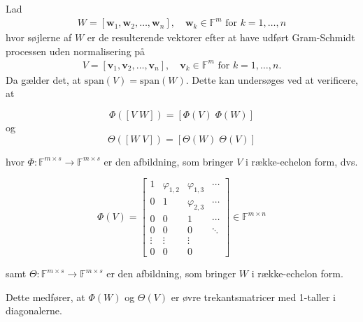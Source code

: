 \vspace{0.5cm}
\begin{theorem}\label{span_theorem}
    Lad 
    \begin{gather*}
        W = [\mathbf{w}_1, \mathbf{w}_2, \ldots, \mathbf{w}_n], \quad \mathbf{w}_k \in \mathbb{F}^m \text{ for } k = 1, \ldots, n
    \end{gather*}
    hvor søjlerne af \( W \) er de resulterende vektorer efter at have udført Gram-Schmidt processen uden normalisering på 
    \begin{gather*}
        V = [\mathbf{v}_1, \mathbf{v}_2, \ldots, \mathbf{v}_n], \quad \mathbf{v}_k \in \mathbb{F}^m \text{ for } k = 1, \ldots, n.
    \end{gather*}
    Da gælder det, at \( \text{span}(V) = \text{span}(W) \). Dette kan undersøges ved at verificere, at
    
    \[ \Phi([V \; W]) = [\Phi(V) \; \Phi(W)] \]
    og 
    \[\Theta([W \; V]) = [\Theta(W) \; \Theta(V)] \]

    hvor \(\Phi : \mathbb{F}^{m \times s} \to \mathbb{F}^{m \times s}\) er den afbildning, som bringer \(V\) i række-echelon form, dvs.
    
    \[
        \Phi(V) = 
        \begin{bmatrix}
            1 & \varphi_{1,2} & \varphi_{1,3} & \cdots \\
            0 & 1 & \varphi_{2,3} & \cdots \\
            0 & 0 & 1 & \cdots \\
            0 & 0 & 0 & \ddots\\
            \vdots & \vdots & \vdots  \\
            0 & 0 & 0 & 
        \end{bmatrix} \in \mathbb{F}^{m \times n}
    \]

    samt \(\Theta : \mathbb{F}^{m \times s} \to \mathbb{F}^{m \times s}\) er den afbildning, som bringer \(W\) i række-echelon form.

    Dette medfører, at \(\Phi(W)\) og \(\Theta(V)\) er øvre trekantsmatricer med 1-taller i diagonalerne.
\end{theorem}


